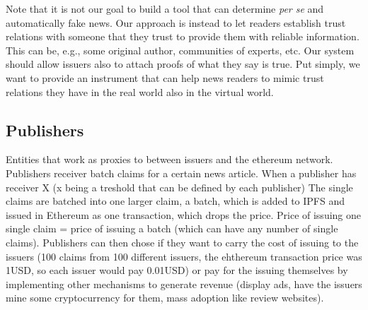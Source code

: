 Note that it is not our goal to build a tool that can determine {\em per se} and automatically fake news. Our approach is instead to let readers establish trust relations with someone that they trust to provide them with reliable information. This can be, e.g., some original author, communities of experts, etc. Our system should allow issuers also to attach proofs of what they say is true. Put simply, we want to provide an instrument that can help news readers to mimic trust relations they have in the real world also in the virtual world.



\subsection{Publishers}
Entities that work as proxies to between issuers and the ethereum network.
Publishers receiver batch claims for a certain news article. When a publisher has receiver X (x being a treshold that can be defined by each publisher)
The single claims are batched into one larger claim, a batch, which is added to IPFS and issued in Ethereum as one transaction, which drops the price. Price of issuing one single claim = price of issuing a batch (which can have any number of single claims).
Publishers can then chose if they want to carry the cost of issuing to the issuers (100 claims from 100 different issuers, the ehthereum transaction price was 1USD, so each issuer would pay 0.01USD) or pay for the issuing themselves by implementing other mechanisms to generate revenue (display ads, have the issuers mine some cryptocurrency for them, mass adoption like review websites).
